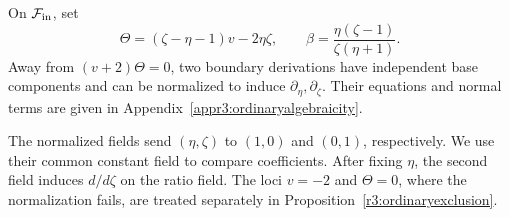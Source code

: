 \documentclass[11pt,a4paper]{article}
\numberwithin{equation}{section}
\theoremstyle{plain}
\theoremstyle{definition}
\theoremstyle{remark}
\begin{document}
On $\mathcal F_{\rm in}$, set
\begin{equation}\label{r3:ordinary-boundary-coordinates}
 \Theta=(\zeta-\eta-1)v-2\eta\zeta,\qquad
 \beta=\frac{\eta(\zeta-1)}{\zeta(\eta+1)}.
\end{equation}
Away from $(v+2)\Theta=0$, two boundary derivations have independent
base components and can be normalized to induce
$\partial_\eta,\partial_\zeta$. Their equations and normal terms are
given in Appendix~\ref{appr3:ordinaryalgebraicity}.

The normalized fields send $(\eta,\zeta)$ to $(1,0)$ and
$(0,1)$, respectively. We use their common constant field to
compare coefficients. After fixing $\eta$, the second field
induces $d/d\zeta$ on the ratio field. The loci $v=-2$ and
$\Theta=0$, where the normalization fails, are treated separately
in Proposition~\ref{r3:ordinaryexclusion}.
\end{document}

